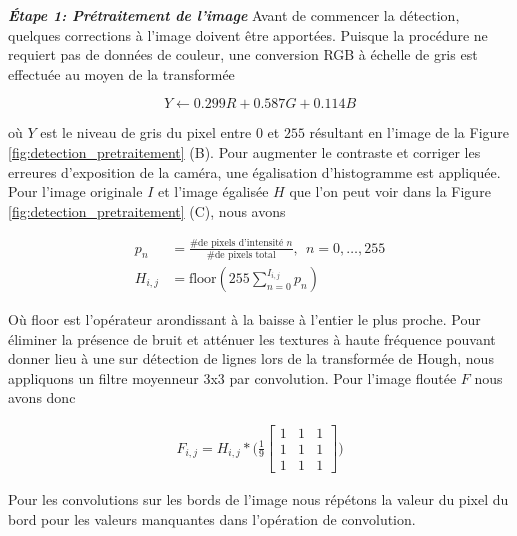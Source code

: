 \textbf{\textit{Étape 1: Prétraitement de l'image}} Avant de commencer la détection, quelques corrections à l'image doivent être apportées. Puisque la procédure ne requiert pas de données de couleur, une conversion RGB à échelle de gris est effectuée au moyen de la transformée

\[
 Y \leftarrow 0.299 R + 0.587 G + 0.114 B
\]

où $Y$ est le niveau de gris du pixel entre $0$ et $255$ résultant en l'image de la Figure \ref{fig:detection_pretraitement} (B). Pour augmenter le contraste et corriger les erreures d'exposition de la caméra, une égalisation d'histogramme est appliquée. Pour l'image originale $I$ et l'image égalisée $H$ que l'on peut voir dans la Figure \ref{fig:detection_pretraitement} (C), nous avons

\begin{align}
  p_n &= \frac{\text{\# de pixels d'intensité } n }{\text{\# de pixels total}}, \ \ n = 0, \ldots, 255 \\
  H_{i,j} &= \text{floor}(255 \sum_{n=0}^{I_{i,j}} p_n)
\end{align}

Où floor est l'opérateur arondissant à la baisse à l'entier le plus proche. Pour éliminer la présence de bruit et atténuer les textures à haute fréquence pouvant donner lieu à une sur détection de lignes lors de la transformée de Hough, nous appliquons un filtre moyenneur 3x3 par convolution. Pour l'image floutée $F$ nous avons donc

\begin{align}
  F_{i,j} = H_{i,j} * \Bigg(\frac{1}{9}
    \begin{bmatrix}
      1 & 1 & 1\\
      1 & 1 & 1\\
      1 & 1 & 1
    \end{bmatrix}
  \Bigg)
\end{align}

Pour les convolutions sur les bords de l'image nous répétons la valeur du pixel du bord pour les valeurs manquantes dans l'opération de convolution.

